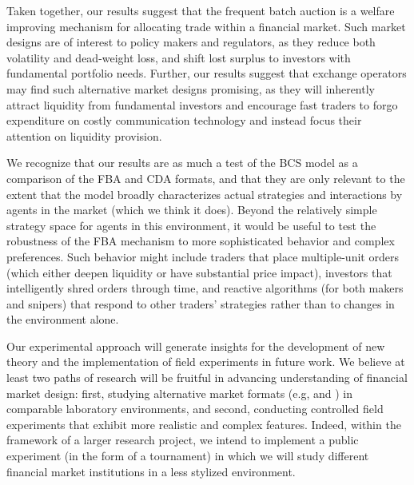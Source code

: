 \documentclass[12pt]{article}
\begin{document}
Taken together, our results suggest that the frequent batch auction is a welfare improving mechanism for allocating trade within a financial market. Such market designs are of interest to policy makers and regulators, as they reduce both volatility and dead-weight loss, and shift lost surplus to investors with fundamental portfolio needs. Further, our results suggest that exchange operators may find such alternative market designs promising, as they will inherently attract liquidity from fundamental investors and encourage fast traders to forgo expenditure on costly communication technology and instead focus their attention on liquidity provision. 

We recognize that our results are as much a test of the BCS model as a comparison of the FBA and CDA formats, and that they are only relevant to the extent that the model broadly characterizes actual strategies and interactions by agents in the market (which we think it does). Beyond the relatively simple strategy space for agents in this environment, it would be useful to test the robustness of the FBA mechanism to more sophisticated behavior and complex preferences. Such behavior might include traders that place multiple-unit orders (which either deepen liquidity or have substantial price impact), investors that intelligently shred orders through time, and reactive algorithms (for both makers and snipers) that respond to other traders’ strategies rather than to changes in the environment alone. 

Our experimental approach will generate insights for the development of new theory and the implementation of field experiments in future work. We believe at least two paths of research will be fruitful in advancing understanding of financial market design: first, studying alternative market formats (e.g, \cite{Kyle2017} and \cite{Aldrich2017}) in comparable laboratory environments, and second, conducting controlled field experiments that exhibit more realistic and complex features. Indeed, within the framework of a larger research project, we intend to implement a public experiment (in the form of a tournament) in which we will study different financial market institutions in a less stylized environment.

\end{document}
